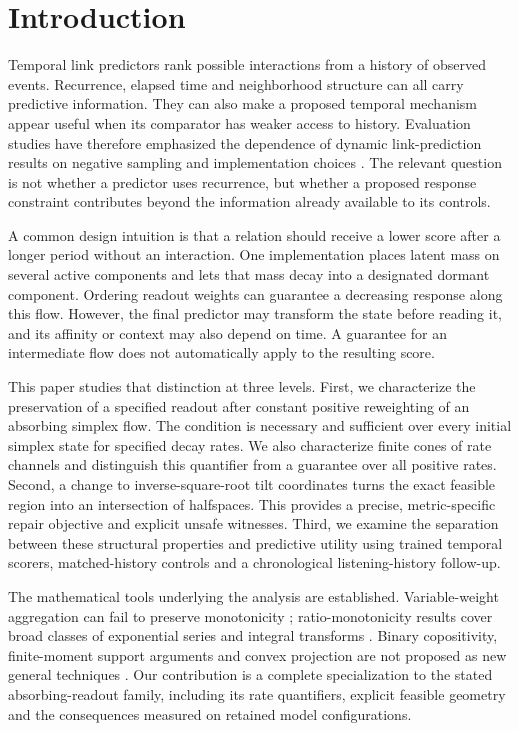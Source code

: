 \documentclass[pdflatex,sn-vancouver-num]{sn-jnl}
\theoremstyle{thmstyleone}
\begin{document}
\section{Introduction}\label{sec:introduction}
Temporal link predictors rank possible interactions from a history of observed events. Recurrence, elapsed time and neighborhood structure can all carry predictive information. They can also make a proposed temporal mechanism appear useful when its comparator has weaker access to history. Evaluation studies have therefore emphasized the dependence of dynamic link-prediction results on negative sampling and implementation choices \cite{evaluation,dyglib}. The relevant question is not whether a predictor uses recurrence, but whether a proposed response constraint contributes beyond the information already available to its controls.

A common design intuition is that a relation should receive a lower score after a longer period without an interaction. One implementation places latent mass on several active components and lets that mass decay into a designated dormant component. Ordering readout weights can guarantee a decreasing response along this flow. However, the final predictor may transform the state before reading it, and its affinity or context may also depend on time. A guarantee for an intermediate flow does not automatically apply to the resulting score.

This paper studies that distinction at three levels. First, we characterize the preservation of a specified readout after constant positive reweighting of an absorbing simplex flow. The condition is necessary and sufficient over every initial simplex state for specified decay rates. We also characterize finite cones of rate channels and distinguish this quantifier from a guarantee over all positive rates. Second, a change to inverse-square-root tilt coordinates turns the exact feasible region into an intersection of halfspaces. This provides a precise, metric-specific repair objective and explicit unsafe witnesses. Third, we examine the separation between these structural properties and predictive utility using trained temporal scorers, matched-history controls and a chronological listening-history follow-up.

The mathematical tools underlying the analysis are established. Variable-weight aggregation can fail to preserve monotonicity \cite{mixture,weighted}; ratio-monotonicity results cover broad classes of exponential series and integral transforms \cite{ratio,series,karp}. Binary copositivity, finite-moment support arguments and convex projection are not proposed as new general techniques \cite{copositive,moment,coordinate}. Our contribution is a complete specialization to the stated absorbing-readout family, including its rate quantifiers, explicit feasible geometry and the consequences measured on retained model configurations.
\end{document}
